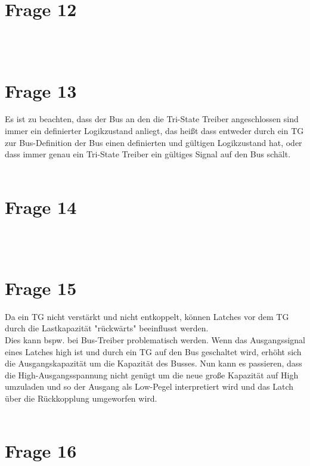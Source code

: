 \documentclass[a4paper]{scrartcl}
\begin{document}
\section*{Frage 12}

~\\
~\\
\section*{Frage 13}
Es ist zu beachten, dass der Bus an den die Tri-State Treiber angeschlossen sind immer ein definierter Logikzustand anliegt, das heißt dass entweder durch ein TG zur Bus-Definition der Bus einen definierten und gültigen Logikzustand hat, oder dass immer genau ein Tri-State Treiber ein gültiges Signal auf den Bus schält.
~\\
~\\
\section*{Frage 14}

~\\
~\\
\section*{Frage 15}
Da ein TG nicht verstärkt und nicht entkoppelt, können Latches vor dem TG durch die Lastkapazität "rückwärts" beeinflusst werden.\\
Dies kann bspw. bei Bus-Treiber problematisch werden. Wenn das Ausgangssignal eines Latches high ist und durch ein TG auf den Bus geschaltet wird, erhöht sich die Ausgangskapazität um die Kapazität des Busses. Nun kann es passieren, dass die High-Ausgangsspannung nicht genügt um die neue große Kapazität auf High umzuladen und so der Ausgang als Low-Pegel interpretiert wird und das Latch über die Rückkopplung umgeworfen wird.
~\\
~\\
\section*{Frage 16}

~\\
~\\
\end{document}
